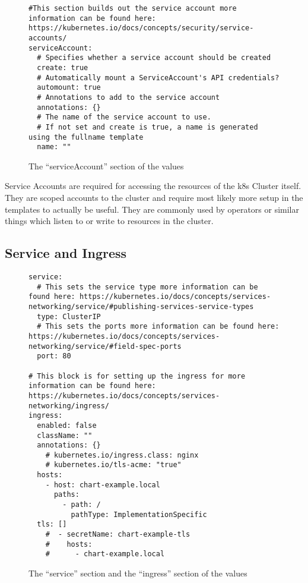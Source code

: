 \documentclass[english,10pt]{scrbook}
\begin{document}
\begin{figure}[h]
\begin{verbatim}
#This section builds out the service account more information can be found here: https://kubernetes.io/docs/concepts/security/service-accounts/
serviceAccount:
  # Specifies whether a service account should be created
  create: true
  # Automatically mount a ServiceAccount's API credentials?
  automount: true
  # Annotations to add to the service account
  annotations: {}
  # The name of the service account to use.
  # If not set and create is true, a name is generated using the fullname template
  name: ""
\end{verbatim}
\caption{The \enquote{serviceAccount} section of the \gls{values}}\label{code:service_account_section}
\end{figure}

Service Accounts are required for accessing the resources of the \gls{k8s} Cluster itself.
They are scoped accounts to the cluster and require most likely more setup in the templates to actually be useful.
They are commonly used by operators or similar things which listen to or write to resources in the cluster.
\clearpage

\subsection{Service and Ingress}
\lipsum[2-4]

\begin{figure}[h]
\begin{verbatim}
service:
  # This sets the service type more information can be found here: https://kubernetes.io/docs/concepts/services-networking/service/#publishing-services-service-types
  type: ClusterIP
  # This sets the ports more information can be found here: https://kubernetes.io/docs/concepts/services-networking/service/#field-spec-ports
  port: 80

# This block is for setting up the ingress for more information can be found here: https://kubernetes.io/docs/concepts/services-networking/ingress/
ingress:
  enabled: false
  className: ""
  annotations: {}
    # kubernetes.io/ingress.class: nginx
    # kubernetes.io/tls-acme: "true"
  hosts:
    - host: chart-example.local
      paths:
        - path: /
          pathType: ImplementationSpecific
  tls: []
    #  - secretName: chart-example-tls
    #    hosts:
    #      - chart-example.local
\end{verbatim}
\caption{The \enquote{service} section and the \enquote{ingress} section of the \gls{values}}\label{code:service_and_ingress_section}
\end{figure}
\clearpage
\end{document}
